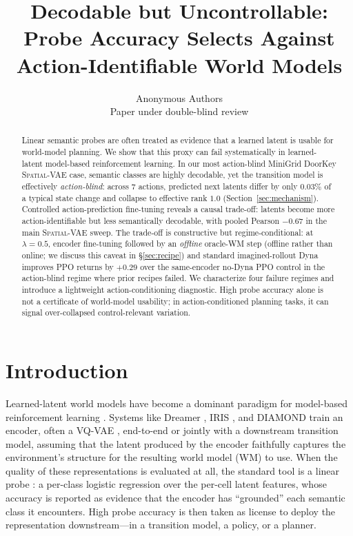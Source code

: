 \documentclass{article}
\title{Decodable but Uncontrollable: Probe Accuracy Selects Against Action-Identifiable World Models}
\author{Anonymous Authors \\
Paper under double-blind review}
\newcommand{\encSpatialVAE}{\textsc{Spatial-VAE}}
\begin{document}
\maketitle

\begin{abstract}
  Linear semantic probes are often treated as evidence that a learned latent is usable for world-model planning. We show that this proxy can fail systematically in learned-latent model-based reinforcement learning. In our most action-blind MiniGrid DoorKey \encSpatialVAE{} case, semantic classes are highly decodable, yet the transition model is effectively \emph{action-blind}: across $7$ actions, predicted next latents differ by only $0.03\%$ of a typical state change and collapse to effective rank $1.0$ (Section~\ref{sec:mechanism}). Controlled action-prediction fine-tuning reveals a causal trade-off: latents become more action-identifiable but less semantically decodable, with pooled Pearson $\mathbf{-0.67}$ in the main \encSpatialVAE{} sweep. The trade-off is constructive but regime-conditional: at $\lambda{=}0.5$, encoder fine-tuning followed by an \emph{offline} oracle-WM step (offline rather than online; we discuss this caveat in \S\ref{sec:recipe}) and standard imagined-rollout Dyna improves PPO returns by $\mathbf{+0.29}$ over the same-encoder no-Dyna PPO control in the action-blind regime where prior recipes failed. We characterize four failure regimes and introduce a lightweight action-conditioning diagnostic. High probe accuracy alone is not a certificate of world-model usability; in action-conditioned planning tasks, it can signal over-collapsed control-relevant variation.
\end{abstract}

\section{Introduction}

Learned-latent world models have become a dominant paradigm for model-based reinforcement learning \citep{ha2018worldmodels,moerland2023mbrl}. Systems like Dreamer \citep{hafner2023diverse}, IRIS \citep{micheli2023iris}, and DIAMOND \citep{alonso2024diamond} train an encoder, often a VQ-VAE \citep{oord2017vqvae}, end-to-end or jointly with a downstream transition model, assuming that the latent produced by the encoder faithfully captures the environment's structure for the resulting world model (WM) to use. When the quality of these representations is evaluated at all, the standard tool is a linear probe \citep{alain2016probes}: a per-class logistic regression over the per-cell latent features, whose accuracy is reported as evidence that the encoder has ``grounded'' each semantic class it encounters. High probe accuracy is then taken as license to deploy the representation downstream---in a transition model, a policy, or a planner.
\end{document}
